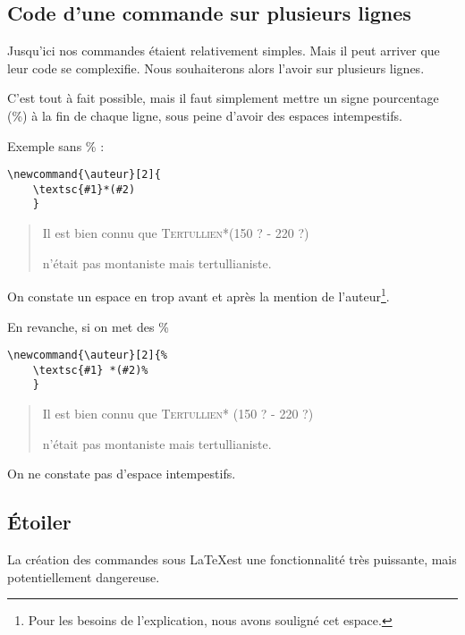 \subsection{Code d'une commande sur plusieurs lignes}\label{commandepourcent}

Jusqu'ici nos commandes étaient relativement simples. Mais il peut arriver que leur code se complexifie. Nous souhaiterons alors l'avoir sur plusieurs lignes.

C'est tout à fait possible, mais il faut simplement mettre  un signe pourcentage (\%) à la fin de chaque ligne, sous peine d'avoir  des espaces intempestifs.

Exemple sans  \% :

\begin{verbatim}
\newcommand{\auteur}[2]{
	\textsc{#1}*(#2)
	}
\end{verbatim}

\renewcommand{\auteur}[2]{\underline{ }%
	\textsc{#1}*(#2)\underline{ }%
}

\begin{quotation}
Il est bien connu que \auteur{Tertullien}{150 ? - 220 ?}
n'était pas montaniste mais tertullianiste.
\end{quotation}

On constate un espace en trop avant et après la mention de l'auteur\footnote{Pour les besoins de l'explication, nous avons souligné cet espace.}.

En revanche, si on met des \% 

\begin{verbatim}
\newcommand{\auteur}[2]{%
	\textsc{#1} *(#2)%
	}
\end{verbatim}

\renewcommand{\auteur}[2]{%
	\textsc{#1}* (#2)%
}

\begin{quotation}
Il est bien connu que \auteur{Tertullien}{150 ? - 220 ?}
n'était pas montaniste mais tertullianiste.
\end{quotation}

On ne constate pas d'espace intempestifs.


\subsection[Étoiler newcommand]{Étoiler }

La création des commandes sous \LaTeX est une fonctionnalité très puissante, mais potentiellement dangereuse.

